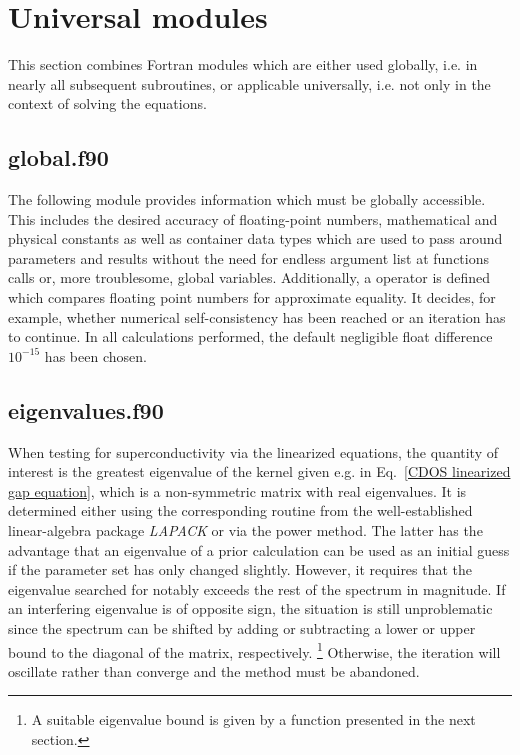 \section{Universal modules}

This section combines Fortran modules which are either used globally, i.e. in
nearly all subsequent subroutines, or applicable universally, i.e. not only in
the context of solving the  equations.

\subsection{global.f90}

The following module provides information which must be globally accessible.
This includes the desired accuracy of floating-point numbers, mathematical and
physical constants as well as container data types which are used to pass around
parameters and results without the need for endless argument list at functions
calls or, more troublesome, global variables. Additionally, a operator is
defined which compares floating point numbers for approximate equality. It
decides, for example, whether numerical self-consistency has been reached or an
iteration has to continue. In all calculations performed, the default negligible
float difference $10^{-15}$ has been chosen.



\subsection{eigenvalues.f90}

When testing for superconductivity via the linearized 
equations, the quantity of interest is the greatest eigenvalue of the kernel
given e.g. in Eq.~\ref{CDOS linearized gap equation}, which is a non-symmetric
matrix with real eigenvalues. It is determined either using the corresponding
routine from the well-established linear-algebra package \emph{LAPACK}
\cite{LAPACK99} or via the power method. The latter has the advantage that an
eigenvalue of a prior calculation can be used as an initial guess if the
parameter set has only changed slightly. However, it requires that the
eigenvalue searched for notably exceeds the rest of the spectrum in magnitude.
If an interfering eigenvalue is of opposite sign, the situation is still
unproblematic since the spectrum can be shifted by adding or subtracting a lower
or upper bound to the diagonal of the matrix, respectively.%
%
\footnote{A suitable eigenvalue bound is given by a function presented in the
next section.}
%
Otherwise, the iteration will oscillate rather than converge and the method must
be abandoned.

